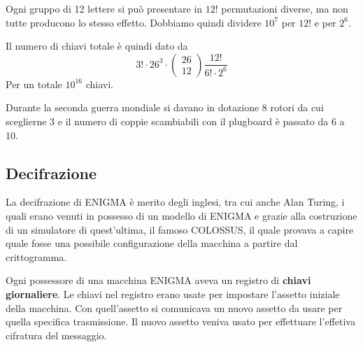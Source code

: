 Ogni gruppo di 12 lettere si pu\`o presentare in $12!$ permutazioni diverse, ma non tutte producono lo stesso effetto.
Dobbiamo quindi dividere $10^7$ per $12!$ e per $2^6$.

Il numero di chiavi totale \`e quindi dato da
\[
	3! \cdot 26^3 \cdot
	\begin{pmatrix}
		26 \\ 12
	\end{pmatrix}
	\frac{12!}{6! \cdot 2^6}
\]
Per un totale $10^{16}$ chiavi.

Durante la seconda guerra mondiale si davano in dotazione 8 rotori da cui sceglierne 3 e il numero di coppie scambiabili
con il plugboard \`e passato da 6 a 10.

\subsection{Decifrazione}
La decifrazione di ENIGMA \`e merito degli inglesi, tra cui anche Alan Turing, i quali erano venuti in possesso di un
modello di ENIGMA e grazie alla costruzione di un simulatore di quest'ultima, il famoso COLOSSUS, il quale provava a
capire quale fosse una possibile configurazione della macchina a partire dal crittogramma.

Ogni possessore di una macchina ENIGMA aveva un registro di \textbf{chiavi giornaliere}. Le chiavi nel registro erano usate
per impostare l'assetto iniziale della macchina. Con quell'assetto si comunicava un nuovo assetto da usare per quella
specifica trasmissione. Il nuovo assetto veniva usato per effettuare l'effetiva cifratura del messaggio.